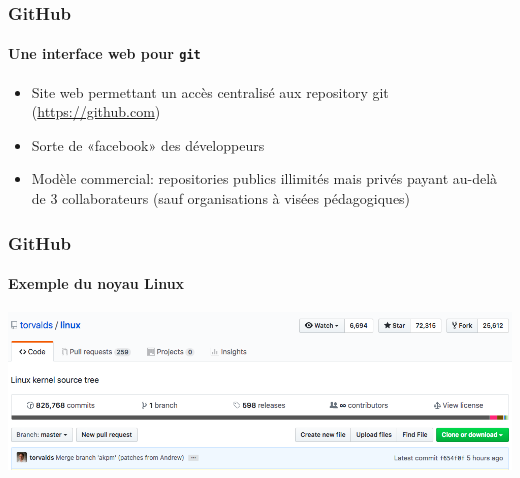 \begin{frame}
\frametitle{GitHub}
\framesubtitle{Une interface web pour \texttt{git}}

\begin{itemize}[<+->]
	\item Site web permettant un accès centralisé aux repository git (\url{https://github.com})



	\item Sorte de «facebook» des développeurs

	\item Modèle commercial: repositories publics illimités mais privés payant au-delà de 3 collaborateurs (sauf organisations à visées pédagogiques)

\end{itemize}

\end{frame}


\begin{frame}
\frametitle{GitHub}
\framesubtitle{Exemple du noyau Linux}

	\begin{center}
			\includegraphics[width=\linewidth]{figures/github_linux.png}
	\end{center}

\end{frame}

